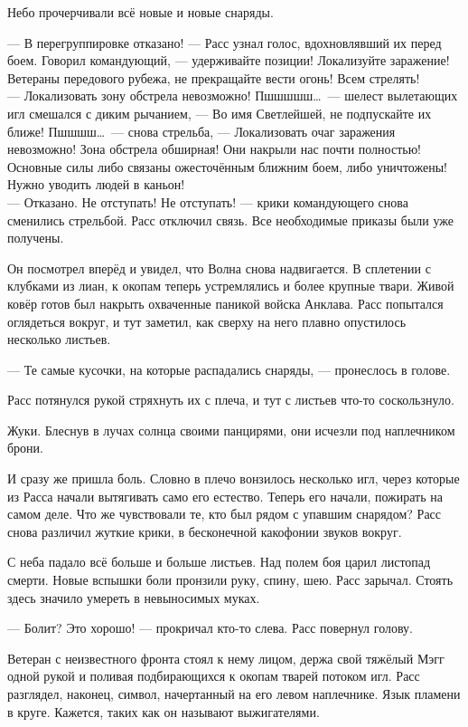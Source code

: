 Небо прочерчивали всё новые и новые снаряды.

\noindent --- В перегруппировке отказано! --- Расс узнал голос, вдохновлявший 
их перед боем. Говорил командующий, --- удерживайте позиции! Локализуйте 
заражение! Ветераны передового рубежа, не прекращайте вести огонь! Всем 
стрелять!\\
--- Локализовать зону обстрела невозможно! Пшшшшш\ldots\ --- шелест вылетающих 
игл смешался с диким рычанием, --- Во имя Светлейшей, не подпускайте их ближе! 
Пшшшш\ldots\ --- снова стрельба, --- Локализовать очаг заражения невозможно! 
Зона обстрела обширная! Они накрыли нас почти полностью! Основные силы либо 
связаны ожесточённым ближним боем, либо уничтожены! Нужно уводить людей в 
каньон!\\
--- Отказано. Не отступать! Не отступать! --- крики командующего снова 
сменились стрельбой. Расс отключил связь. Все необходимые приказы были уже 
получены.

Он посмотрел вперёд и увидел, что Волна снова надвигается. В сплетении с 
клубками из лиан, к окопам теперь устремлялись и более крупные твари. Живой 
ковёр готов был накрыть охваченные паникой войска Анклава. Расс попытался 
оглядеться вокруг, и тут заметил, как сверху на него плавно опустилось несколько 
листьев.

\noindent --- Те самые кусочки, на которые распадались снаряды, --- пронеслось 
в голове.

Расс потянулся рукой стряхнуть их с плеча, и тут с листьев что-то соскользнуло.

Жуки. Блеснув в лучах солнца своими панцирями, они исчезли под наплечником брони.

И сразу же пришла боль. Словно в плечо вонзилось несколько игл, через которые 
из Расса начали вытягивать само его естество. Теперь его начали, пожирать на 
самом деле. Что же чувствовали те, кто был рядом с упавшим снарядом? Расс снова 
различил жуткие крики, в бесконечной какофонии звуков вокруг.

С неба падало всё больше и больше листьев. Над полем боя царил листопад смерти. 
Новые вспышки боли пронзили руку, спину, шею. Расс зарычал. Стоять здесь значило 
умереть в невыносимых муках.

\noindent --- Болит? Это хорошо! --- прокричал кто-то слева. Расс повернул 
голову.

Ветеран с неизвестного фронта стоял к нему лицом, держа свой тяжёлый Мэгг одной 
рукой и поливая подбирающихся к окопам тварей потоком игл. Расс разглядел, 
наконец, символ, начертанный на его левом наплечнике. Язык пламени в круге. 
Кажется, таких как он называют выжигателями.

